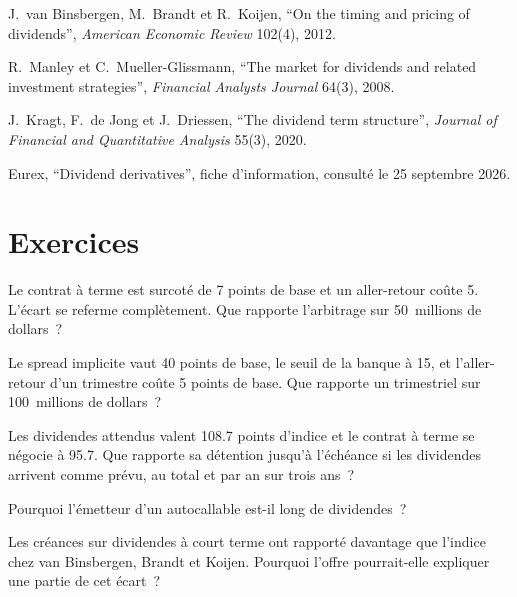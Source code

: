 \begin{omsources}
\item J.~van Binsbergen, M.~Brandt et R.~Koijen, ``On the timing and pricing of dividends'', \emph{American Economic Review} 102(4), 2012.
\item R.~Manley et C.~Mueller-Glissmann, ``The market for dividends and related investment strategies'', \emph{Financial Analysts Journal} 64(3),
2008.
\item J.~Kragt, F.~de Jong et J.~Driessen, ``The dividend term structure'', \emph{Journal of Financial and Quantitative Analysis} 55(3), 2020.
\item Eurex, ``Dividend derivatives'', fiche d'information, consulté le 25 septembre 2026.
\end{omsources}

\section{Exercices}

\begin{exercise}[$\star$]\label{exo:s2:delta-one-and-dividends:1}
Le contrat à terme est surcoté de 7 points de base et un aller-retour coûte 5. L'écart se referme complètement. Que rapporte l'arbitrage sur 50~millions de dollars~?
\end{exercise}

\begin{exercise}[$\star$]\label{exo:s2:delta-one-and-dividends:2}
Le spread implicite vaut 40 points de base, le seuil de la banque à 15, et l'aller-retour d'un trimestre coûte 5 points de base. Que rapporte un 
trimestriel sur 100~millions de dollars~?
\end{exercise}

\begin{exercise}[$\star$]\label{exo:s2:delta-one-and-dividends:3}
Les dividendes attendus valent 108.7 points d'indice et le contrat à terme se négocie à 95.7. Que rapporte sa détention jusqu'à l'échéance si les dividendes arrivent comme prévu, au total et par
an sur trois ans~?
\end{exercise}

\begin{exercise}[$\star\star$]\label{exo:s2:delta-one-and-dividends:4}
Pourquoi l'émetteur d'un autocallable est-il long de dividendes~?
\end{exercise}

\begin{exercise}[$\star\star$]\label{exo:s2:delta-one-and-dividends:5}
Les créances sur dividendes à court terme ont rapporté davantage que l'indice chez van Binsbergen, Brandt et Koijen. Pourquoi l'offre pourrait-elle expliquer une partie de cet écart~?
\end{exercise}

